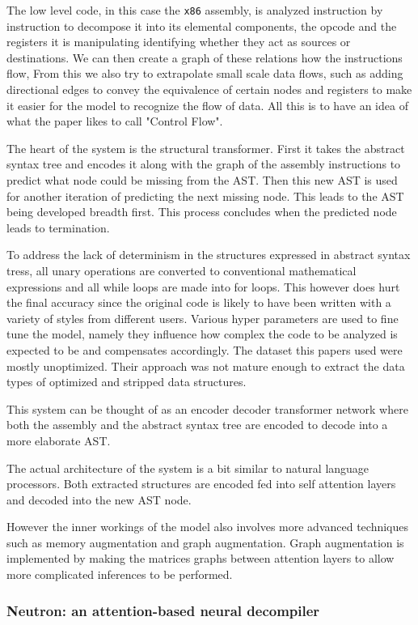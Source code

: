 \documentclass[conference,a4paper]{IEEEtran}
\begin{document}
The low level code, in this case the \verb|x86| assembly, is analyzed instruction by instruction to decompose it into its elemental components, the opcode and the registers it is manipulating identifying whether they act as sources or destinations.
We can then create a graph of these relations how the instructions flow,
From this we also try to extrapolate small scale data flows, such as adding directional edges to convey the equivalence of certain nodes and registers to make it easier for the model to recognize the flow of data.
All this is to have an idea of what the paper likes to call "Control Flow".

The heart of the system is the structural transformer.
First it takes the abstract syntax tree and encodes it along with the graph of the assembly instructions to predict what node could be missing from the AST.
Then this new AST is used for another iteration of predicting the next missing node.
This leads to the AST being developed breadth first.
This process concludes when the predicted node leads to termination.

To address the lack of determinism in the structures expressed in abstract syntax tress, all unary operations are converted to conventional mathematical expressions and all while loops are made into for loops.
This however does hurt the final accuracy since the original code is likely to have been written with a variety of styles from different users.
Various hyper parameters are used to fine tune the model, namely they influence how complex the code to be analyzed is expected to be and compensates accordingly.
The dataset this papers used were mostly unoptimized. Their approach was not mature enough to extract the data types of optimized and stripped data structures.

This system can be thought of as an encoder decoder transformer network where both the assembly and the abstract syntax tree are encoded to decode into a more elaborate AST.

The actual architecture of the system is a bit similar to natural language processors.
Both extracted structures are encoded fed into self attention layers and decoded into the new AST node.

However the inner workings of the model also involves more advanced techniques such as memory augmentation and graph augmentation.
Graph augmentation is implemented by making the matrices graphs between attention layers to allow more complicated inferences to be performed.

\subsubsection{Neutron: an attention-based neural decompiler}
\end{document}

